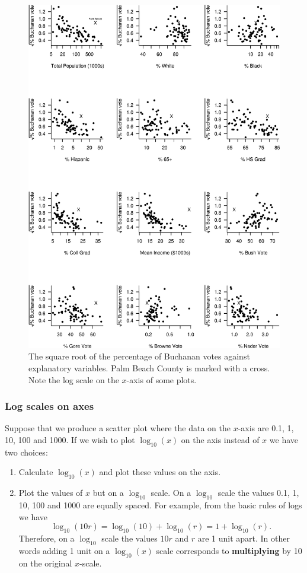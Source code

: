 \documentclass[
  11pt,
  british,
  openany, a4paper]{book}
\providecommand{\tightlist}{%
  \setlength{\itemsep}{0pt}\setlength{\parskip}{0pt}}
\begin{document}
\begin{figure}

{\centering \includegraphics[width=0.75\linewidth]{images/election2} 

}

\caption{The square root of the percentage of Buchanan votes against explanatory variables.  Palm Beach County is marked with a cross.  Note the log scale on the $x$-axis of some plots.}\label{fig:election2}
\end{figure}

\hypertarget{log-scales-on-axes}{%
\subsubsection*{Log scales on axes}\label{log-scales-on-axes}}

Suppose that we produce a scatter plot where the data on the \(x\)-axis are 0.1, 1, 10, 100 and 1000. If we wish to plot \(\log_{10}(x)\) on the axis instead of \(x\) we have two choices:

\begin{enumerate}
\def\labelenumi{(\alph{enumi})}
\tightlist
\item
  Calculate \(\log_{10}(x)\) and plot these values on the axis.
\item
  Plot the values of \(x\) but on a \(\log_{10}\) scale. On a \(\log_{10}\) scale the values 0.1, 1, 10, 100 and 1000 are equally spaced. For example, from the basic rules of logs we have
  \[\log_{10}(10r) = \log_{10}(10)+\log_{10}(r)=1+\log_{10}(r).\]
  Therefore, on a \(\log_{10}\) scale the values \(10r\) and \(r\) are 1 unit apart. In other words adding 1 unit on a \(\log_{10}(x)\) scale corresponds to \textbf{multiplying} by 10 on the original \(x\)-scale.
\end{enumerate}
\end{document}
